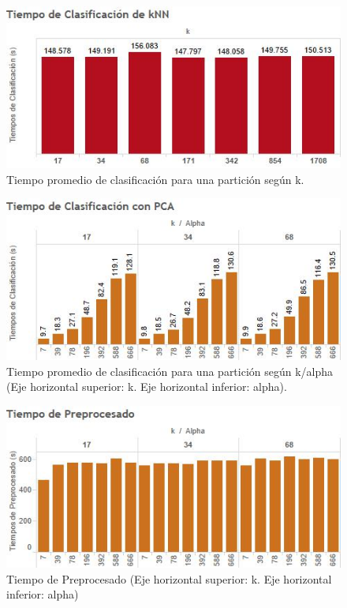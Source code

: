 \documentclass{article}
\begin{document}
\begin{figure}[H]
\centering
\includegraphics[scale=0.90]{TiempoClasificacionkNN.jpg}
\caption{Tiempo promedio de clasificación para una partición según k.}
\label{fig:TiempokNN}
\end{figure}

\begin{figure}[H]
\centering
\includegraphics[scale=0.90]{TiempoClasificacionPCA.jpg}
\caption{Tiempo promedio de clasificación para una partición según k/alpha (Eje horizontal superior: k. Eje horizontal inferior: alpha). }
\label{fig:MissRatePCA}
\end{figure}


\begin{figure}[H]
\centering
\includegraphics[scale=0.90]{preprocesado.jpg}
\caption{Tiempo de Preprocesado (Eje horizontal superior: k. Eje horizontal inferior: alpha)}
\label{fig:Preprocesado}
\end{figure} 
\end{document}
